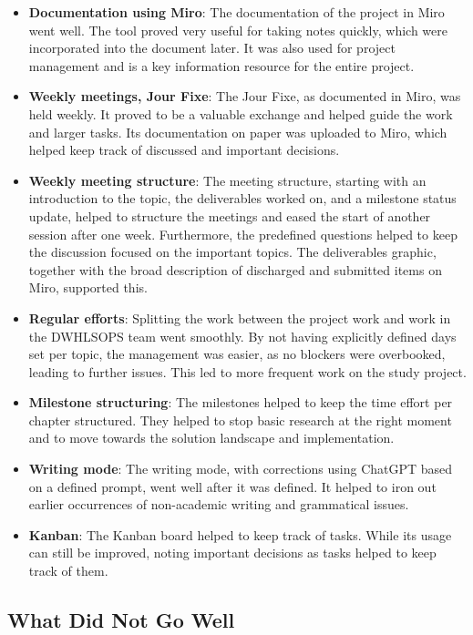\begin{itemize}
    \item \textbf{Documentation using Miro}: The documentation of the project in Miro went well. The tool proved very useful for taking notes quickly, which were incorporated into the document later. It was also used for project management and is a key information resource for the entire project.
    \item \textbf{Weekly meetings, Jour Fixe}: The Jour Fixe, as documented in Miro, was held weekly. It proved to be a valuable exchange and helped guide the work and larger tasks. Its documentation on paper was uploaded to Miro, which helped keep track of discussed and important decisions.
    \item \textbf{Weekly meeting structure}: The meeting structure, starting with an introduction to the topic, the deliverables worked on, and a milestone status update, helped to structure the meetings and eased the start of another session after one week. Furthermore, the predefined questions helped to keep the discussion focused on the important topics. The deliverables graphic, together with the broad description of discharged and submitted items on Miro, supported this.
    \item \textbf{Regular efforts}: Splitting the work between the project work and work in the \gls{DWHLSOPS} team went smoothly. By not having explicitly defined days set per topic, the management was easier, as no blockers were overbooked, leading to further issues. This led to more frequent work on the study project.
    \item \textbf{Milestone structuring}: The milestones helped to keep the time effort per chapter structured. They helped to stop basic research at the right moment and to move towards the solution landscape and implementation.
    \item \textbf{Writing mode}: The writing mode, with corrections using ChatGPT based on a defined prompt, went well after it was defined. It helped to iron out earlier occurrences of non-academic writing and grammatical issues.
    \item \textbf{Kanban}: The Kanban board helped to keep track of tasks. While its usage can still be improved, noting important decisions as tasks helped to keep track of them.
\end{itemize}



\subsection*{What Did Not Go Well}

